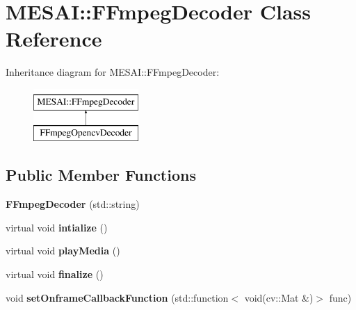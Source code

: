 \hypertarget{class_m_e_s_a_i_1_1_f_fmpeg_decoder}{}\section{M\+E\+S\+AI\+:\+:F\+Fmpeg\+Decoder Class Reference}
\label{class_m_e_s_a_i_1_1_f_fmpeg_decoder}
Inheritance diagram for M\+E\+S\+AI\+:\+:F\+Fmpeg\+Decoder\+:\begin{figure}[H]
\begin{center}
\leavevmode
\includegraphics[height=2.000000cm]{d2/dfc/class_m_e_s_a_i_1_1_f_fmpeg_decoder}
\end{center}
\end{figure}
\subsection*{Public Member Functions}
\begin{DoxyCompactItemize}
\item 
\mbox{\label{class_m_e_s_a_i_1_1_f_fmpeg_decoder_a7ebd1c86816d9510c993c453c2a26d90}} 
{\bfseries F\+Fmpeg\+Decoder} (std\+::string)
\item 
\mbox{\label{class_m_e_s_a_i_1_1_f_fmpeg_decoder_ad7d30c2c905e1c46e12744ec39937305}} 
virtual void {\bfseries intialize} ()
\item 
\mbox{\label{class_m_e_s_a_i_1_1_f_fmpeg_decoder_a2b3b9e74c202fbe852d9e09ee467b175}} 
virtual void {\bfseries play\+Media} ()
\item 
\mbox{\label{class_m_e_s_a_i_1_1_f_fmpeg_decoder_a8a6ac425e188fbd2ff68c5a43e0d24a6}} 
virtual void {\bfseries finalize} ()
\item 
\mbox{\label{class_m_e_s_a_i_1_1_f_fmpeg_decoder_ac1da1b4a9db30b2027a1c9a9821f7b28}} 
void {\bfseries set\+Onframe\+Callback\+Function} (std\+::function$<$ void(cv\+::\+Mat \&)$>$ func)
\end{DoxyCompactItemize}
